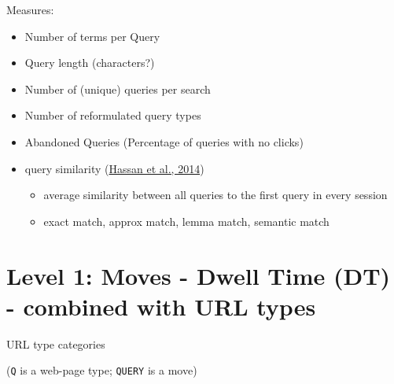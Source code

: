 \documentclass[letterpaper, nobind]{templates/ociamthesis}
\providecommand{\tightlist}{%
  \setlength{\itemsep}{0pt}\setlength{\parskip}{0pt}}
\begin{document}
Measures:

\begin{itemize}
\tightlist
\item
  Number of terms per Query
\item
  Query length (characters?)
\item
  Number of (unique) queries per search
\item
  Number of reformulated query types
\item
  Abandoned Queries (Percentage of queries with no clicks)
\item
  query similarity (\protect\hyperlink{ref-hassan2014struggling}{Hassan et al., 2014})

  \begin{itemize}
  \tightlist
  \item
    average similarity between all queries to the first query in every session
  \item
    exact match, approx match, lemma match, semantic match
  \end{itemize}
\end{itemize}

\hypertarget{level-1-moves---dwell-time-dt---combined-with-url-types}{%
\section{Level 1: Moves - Dwell Time (DT) - combined with URL types}\label{level-1-moves---dwell-time-dt---combined-with-url-types}}

URL type categories

(\texttt{Q} is a web-page type; \texttt{QUERY} is a move)
\end{document}

